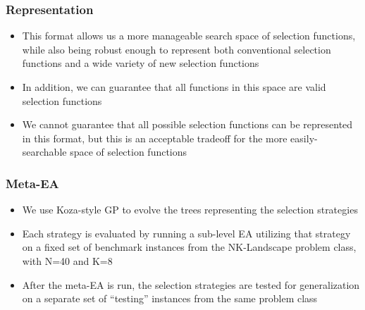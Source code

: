 \documentclass{beamer}
\begin{document}
	\begin{frame}
		\frametitle{Representation}
		
		\begin{itemize}
			 \item<1-|alert@1> This format allows us a more manageable search space of selection functions, while also being robust enough to represent both conventional selection functions and a wide variety of new selection functions
			 \item<2-|alert@2> In addition, we can guarantee that all functions in this space are valid selection functions
			 \item<3-|alert@3> We cannot guarantee that all possible selection functions can be represented in this format, but this is an acceptable tradeoff for the more easily-searchable space of selection functions
		\end{itemize}
	\end{frame}	
	
	\begin{frame}
		\frametitle{Meta-EA}
		
		\begin{itemize}
			 \item<1-|alert@1> We use Koza-style GP to evolve the trees representing the selection strategies
			 \item<2-|alert@2> Each strategy is evaluated by running a sub-level EA utilizing that strategy on a fixed set of benchmark instances from the NK-Landscape problem class, with N=40 and K=8
			 \item<3-|alert@3> After the meta-EA is run, the selection strategies are tested for generalization on a separate set of ``testing'' instances from the same problem class
		\end{itemize}
	\end{frame}
	
\end{document}
